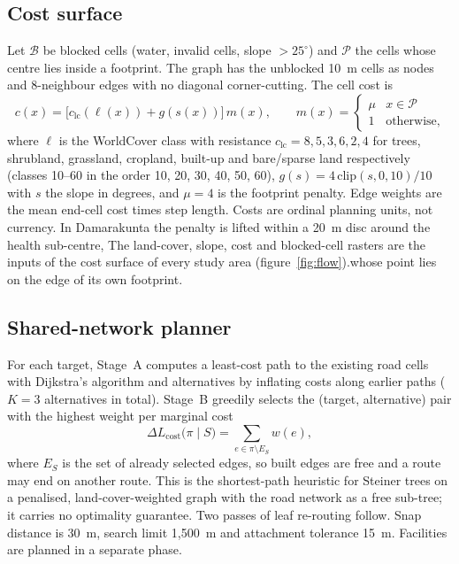\documentclass[12pt,a4paper]{article}
\newcommand{\Lcost}{L_{\mathrm{cost}}}
\begin{document}
\subsection{Cost surface}
Let $\mathcal{B}$ be blocked cells (water, invalid cells, slope $>25^{\circ}$) and $\mathcal{P}$ the cells whose centre lies inside a footprint. The graph has the unblocked 10~m cells as nodes and 8-neighbour edges with no diagonal corner-cutting. The cell cost is
\begin{equation}
c(x)=\bigl[c_{\mathrm{lc}}(\ell(x))+g(s(x))\bigr]\,m(x),\qquad m(x)=\begin{cases}\mu & x\in\mathcal{P}\\ 1 & \text{otherwise,}\end{cases}
\label{eq:cell}
\end{equation}
where $\ell$ is the WorldCover class with resistance $c_{\mathrm{lc}}=8,5,3,6,2,4$ for trees, shrubland, grassland, cropland, built-up and bare/sparse land respectively (classes 10--60 in the order 10, 20, 30, 40, 50, 60), $g(s)=4\,\mathrm{clip}(s,0,10)/10$ with $s$ the slope in degrees, and $\mu=4$ is the footprint penalty. Edge weights are the mean end-cell cost times step length. Costs are ordinal planning units, not currency. In Damarakunta the penalty is lifted within a 20~m disc around the health sub-centre,  The land-cover, slope, cost and blocked-cell rasters are the inputs of the cost surface of every study area (figure~\ref{fig:flow}).whose point lies on the edge of its own footprint.

\subsection{Shared-network planner}
For each target, Stage~A computes a least-cost path to the existing road cells with Dijkstra's algorithm \cite{dijkstra1959note,hart1968astar,collischonn2000lcp} and alternatives by inflating costs along earlier paths ($K=3$ alternatives in total). Stage~B greedily selects the (target, alternative) pair with the highest weight per marginal cost
\begin{equation}
\Delta\Lcost\bigl(\pi\mid S\bigr)=\sum_{e\in\pi\setminus E_S}w(e),
\label{eq:marginal}
\end{equation}
where $E_S$ is the set of already selected edges, so built edges are free and a route may end on another route. This is the shortest-path heuristic for Steiner trees \cite{kou1981steiner,mehlhorn1988steiner} on a penalised, land-cover-weighted graph with the road network as a free sub-tree; it carries no optimality guarantee. Two passes of leaf re-routing follow. Snap distance is 30~m, search limit 1{,}500~m and attachment tolerance 15~m. Facilities are planned in a separate phase.
\end{document}
